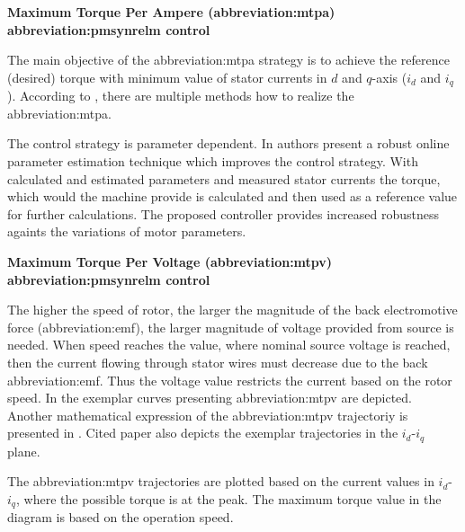 \documentclass[a4paper, twoside, 11pt]{article}
\begin{document}
            \vspace*{1.5cm}
             \hspace*{-\parindent} \textbf{Maximum Torque Per Ampere (\gls{abbreviation:mtpa}) \gls{abbreviation:pmsynrelm} control}\par
                \parskip The main objective of the \gls{abbreviation:mtpa} strategy is to achieve the reference (desired) torque with minimum value of stator currents in $d$ and $q$-axis ($i_d$ and $i_q$). According to \cite{dwivedi-review-on-control-strategies-of-permanent-magnet-assisted-synchronous-reluctance-motor-drive}, there are multiple methods how to realize the \gls{abbreviation:mtpa}.\par
                The control strategy is parameter dependent. In \cite{niazi-robust-maximum-torque-per-ampere-control-of-pmsynrelm} authors present a robust online parameter estimation technique which improves the control strategy. With calculated and estimated parameters and measured stator currents the torque, which would the machine provide is calculated and then used as a reference value for further calculations. The proposed controller provides increased robustness againts the variations of motor parameters.

            \vspace*{1.5cm}
             \hspace*{-\parindent} \textbf{Maximum Torque Per Voltage (\gls{abbreviation:mtpv}) \gls{abbreviation:pmsynrelm} control}\par
                \parskip The higher the speed of rotor, the larger the magnitude of the back electromotive force (\gls{abbreviation:emf}), the larger magnitude of voltage provided from source is needed. When speed reaches the value, where nominal source voltage is reached, then the current flowing through stator wires must decrease due to the back \gls{abbreviation:emf}. Thus the voltage value restricts the current based on the rotor speed. In \cite{sanz-analitical-maximum-torque-per-volt-control-strategu-of-an-interior-permanent-magnet-synchronous-motor-with-very-low-battery-voltage} the exemplar curves presenting \gls{abbreviation:mtpv} are depicted. Another mathematical expression of the \gls{abbreviation:mtpv} trajectoriy is presented in \cite{fletcher-operation-along-the-maximum-torque-per-voltage-trajectory-in-a-direct-torque-and-flux-controlled-interior-permament-magnet-synchronous-motor}. Cited paper also depicts the exemplar trajectories in the $i_d$-$i_q$ plane.
                \par
                The \gls{abbreviation:mtpv} trajectories are plotted based on the current values in $i_d$-$i_q$, where the possible torque is at the peak. The maximum torque value in the diagram is based on the operation speed.
\end{document}
